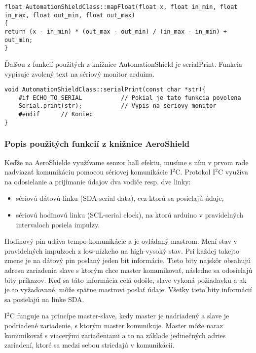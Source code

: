 \begin{lstlisting}[caption={Zdrojový kód funkcie mapFloat.},captionpos=b]
float AutomationShieldClass::mapFloat(float x, float in_min, float in_max, float out_min, float out_max) 
{
return (x - in_min) * (out_max - out_min) / (in_max - in_min) + out_min; 
}
\end{lstlisting}

Ďalšou z funkcií použitých z knižnice AutomationShield je serialPrint. Funkcia vypisuje zvolený text na sériový monitor arduina. 

\begin{lstlisting}[caption={Zdrojový kód funkcie serialPrint.},captionpos=b]
 void AutomationShieldClass::serialPrint(const char *str){   
	#if ECHO_TO_SERIAL           // Pokial je tato funkcia povolena                       
	Serial.print(str);           // Vypis na seriovy monitor                       
	#endif 		// Koniec
}
\end{lstlisting}

\subsubsection{Popis použitých funkcií z knižnice AeroShield}


Keďže na AeroShielde využívame senzor hall efektu, musíme s ním v prvom rade nadviazať komunikáciu pomocou sériovej komunikácie I$^{2}$C. Protokol I$^{2}$C využíva na odosielanie a prijímanie údajov dva vodiče resp. dve linky: 
\begin{itemize}
\item sériovú dátovú linku (SDA-serial data), cez ktorú sa posielajú údaje, 
\item sériovú hodinovú linku (SCL-serial clock), na ktorú arduino v pravidelných intervaloch posiela impulzy. 
\end{itemize}

Hodinový pin udáva tempo komunikácie a je ovládaný mastrom. Mení stav v pravidelných impulzoch z low-nízkeho na high-vysoký stav. Pri každej takejto zmene je na dátový pin poslaný jeden bit informácie. Tieto bity najskôr obsahujú adresu zariadenia slave s ktorým chce master komunikovať, následne sa odosielajú bity príkazov. Keď sa táto informácia celá odošle, slave vykoná požiadavku a ak je to vyžadované, môže spätne mastrovi poslať údaje. Všetky tieto bity informácií sa posielajú na linke SDA\cite{idvac}.

I$^{2}$C funguje na princípe master-slave, kedy master je nadriadený a slave je podriadené zariadenie, s ktorým master komunikuje. Master môže naraz komunikovať s viacerými zariadeniami a to na základe jedinečných adries zariadení, ktoré sa medzi sebou striedajú v komunikácii.   

